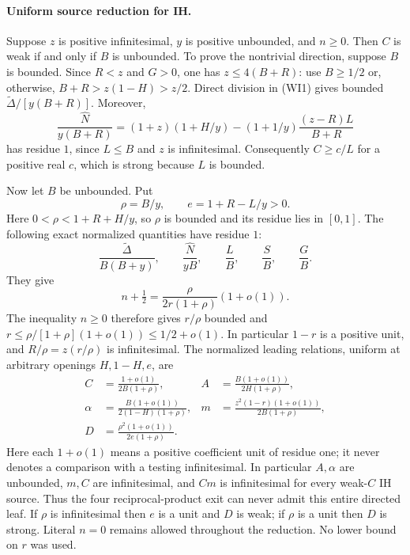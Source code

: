 \paragraph{Uniform source reduction for IH.}
Suppose $z$ is positive infinitesimal, $y$ is positive unbounded,
and $n\ge0$. Then $C$ is weak if and only if $B$ is unbounded.
To prove the nontrivial direction, suppose $B$ is bounded. Since
$R<z$ and $G>0$, one has $z\le4(B+R)$: use $B\ge1/2$
or, otherwise, $B+R>z(1-H)>z/2$. Direct division in (WI1)
gives bounded $\widetilde\Delta/[y(B+R)]$. Moreover,
\[
 \frac{\widehat N}{y(B+R)}
 =(1+z)(1+H/y)
 -(1+1/y)\frac{(z-R)L}{B+R}
\]
has residue $1$, since $L\le B$ and $z$ is infinitesimal.
Consequently $C\ge c/L$ for a positive real $c$, which is strong
because $L$ is bounded.

Now let $B$ be unbounded. Put
\[
 \rho=B/y,\qquad e=1+R-L/y>0.
\]
Here $0<\rho<1+R+H/y$, so $\rho$ is bounded and its residue
lies in $[0,1]$. The following exact normalized quantities have
residue $1$:
\[
 \frac{\widetilde\Delta}{B(B+y)},\qquad
 \frac{\widehat N}{yB},\qquad
 \frac{L}{B},\qquad \frac{S}{B},\qquad\frac{G}{B}.
                                                        \tag{WI2}
\]
They give
\[
 n+\tfrac12=\frac{\rho}{2r(1+\rho)}(1+o(1)).
\]
The inequality $n\ge0$ therefore gives $r/\rho$ bounded and
$r\le\rho/[1+\rho](1+o(1))\le1/2+o(1)$.
In particular $1-r$ is a positive unit, and
$R/\rho=z(r/\rho)$ is infinitesimal. The normalized leading
relations, uniform at arbitrary openings $H,1-H,e$, are
\begin{align*}
 C&=\frac{1+o(1)}{2B(1+\rho)},&
 A&=\frac{B(1+o(1))}{2H(1+\rho)},\\
 \alpha&=\frac{B(1+o(1))}{2(1-H)(1+\rho)},&
 m&=\frac{z^2(1-r)(1+o(1))}{2B(1+\rho)},\\
 D&=\frac{\rho^2(1+o(1))}{2e(1+\rho)}.
                                                        \tag{WI3}
\end{align*}
Here each $1+o(1)$ means a positive coefficient unit of residue one;
it never denotes a comparison with a testing infinitesimal. In
particular $A,\alpha$ are unbounded, $m,C$ are infinitesimal, and
$Cm$ is infinitesimal for every weak-$C$ IH source. Thus the four
reciprocal-product exit can never admit this entire directed leaf.
If $\rho$ is infinitesimal then $e$ is a unit and $D$ is weak;
if $\rho$ is a unit then $D$ is strong. Literal $n=0$ remains
allowed throughout the reduction. No lower bound on $r$ was used.

